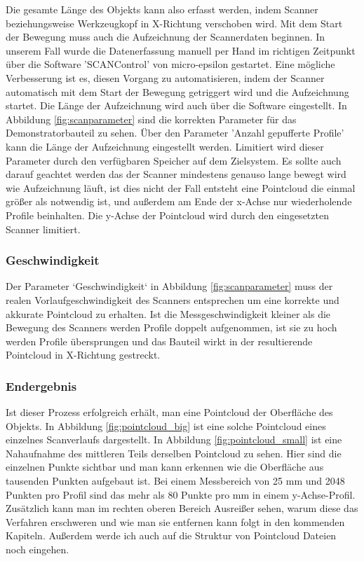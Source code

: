 \documentclass[../main.tex]{subfiles}
\begin{document}
Die gesamte Länge des Objekts kann also erfasst werden, indem Scanner 
beziehungsweise Werkzeugkopf in X-Richtung verschoben wird. Mit dem Start der 
Bewegung muss auch die Aufzeichnung der Scannerdaten beginnen. In unserem Fall wurde
die Datenerfassung manuell per Hand im richtigen Zeitpunkt über die Software 
'SCANControl' von micro-epsilon gestartet. 
Eine mögliche Verbesserung ist es, diesen Vorgang zu automatisieren, indem der 
Scanner automatisch mit dem Start der Bewegung getriggert wird und die Aufzeichnung
startet. Die Länge der Aufzeichnung wird auch über die Software eingestellt. 
In Abbildung \ref{fig:scanparameter} sind die korrekten Parameter für das 
Demonstratorbauteil zu sehen. Über den Parameter 'Anzahl gepufferte Profile' kann 
die Länge der Aufzeichnung eingestellt werden. Limitiert wird dieser Parameter 
durch den verfügbaren Speicher auf dem Zielsystem. Es sollte auch darauf geachtet 
werden das der Scanner mindestens genauso lange bewegt wird wie Aufzeichnung läuft, 
ist dies nicht der Fall entsteht eine Pointcloud die einmal größer als notwendig ist, 
und außerdem am Ende der x-Achse nur wiederholende Profile beinhalten. 
Die y-Achse der Pointcloud wird durch den eingesetzten Scanner limitiert. 


\subsubsection{Geschwindigkeit}
Der Parameter `Geschwindigkeit` in Abbildung \ref{fig:scanparameter} muss der realen Vorlaufgeschwindigkeit des Scanners
entsprechen um eine korrekte und akkurate Pointcloud zu erhalten. Ist die 
Messgeschwindigkeit kleiner als die Bewegung des Scanners werden Profile doppelt 
aufgenommen, ist sie zu hoch werden Profile übersprungen und das Bauteil wirkt in 
der resultierende Pointcloud in X-Richtung gestreckt.

\subsubsection{Endergebnis}

Ist dieser Prozess erfolgreich
erhält, man eine Pointcloud der Oberfläche des Objekts. 
In Abbildung \ref{fig:pointcloud_big} ist eine solche Pointcloud eines einzelnes
Scanverlaufs dargestellt. In Abbildung \ref{fig:pointcloud_small} ist eine Nahaufnahme 
des mittleren Teils derselben Pointcloud zu sehen.
Hier sind die einzelnen Punkte sichtbar und man kann erkennen wie die Oberfläche 
aus tausenden Punkten aufgebaut ist. Bei einem Messbereich von 25 mm und 2048 
Punkten pro Profil \cite{SCANNER} sind das mehr als 80 Punkte pro mm in einem
y-Achse-Profil.
Zusätzlich kann man im rechten oberen 
Bereich Ausreißer sehen, warum diese das Verfahren erschweren und 
wie man sie entfernen kann folgt in den kommenden Kapiteln. Außerdem werde ich auch
auf die Struktur von Pointcloud Dateien noch eingehen.
\end{document}
